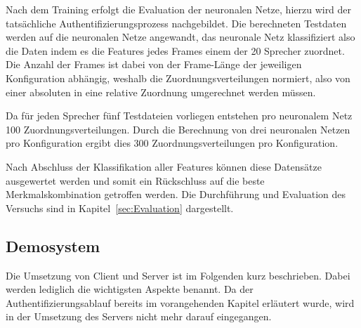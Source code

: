 Nach dem Training erfolgt die Evaluation der neuronalen Netze, hierzu wird der tatsächliche Authentifizierungsprozess nachgebildet.
Die berechneten Testdaten werden auf die neuronalen Netze angewandt, das neuronale Netz klassifiziert also die Daten indem es die Features jedes Frames einem der 20 Sprecher zuordnet.
Die Anzahl der Frames ist dabei von der Frame-Länge der jeweiligen Konfiguration abhängig, weshalb die Zuordnungsverteilungen normiert, also von einer absoluten in eine relative Zuordnung umgerechnet werden müssen.

Da für jeden Sprecher fünf Testdateien vorliegen entstehen pro neuronalem Netz 100 Zuordnungsverteilungen.
Durch die Berechnung von drei neuronalen Netzen pro Konfiguration ergibt dies 300 Zuordnungsverteilungen pro Konfiguration.

Nach Abschluss der Klassifikation aller Features können diese Datensätze ausgewertet werden und somit ein Rückschluss auf die beste Merkmalskombination getroffen werden.
Die Durchführung und Evaluation des Versuchs sind in Kapitel~\ref{sec:Evaluation} dargestellt.

\subsection{Demosystem}
Die Umsetzung von Client und Server ist im Folgenden kurz beschrieben.
Dabei werden lediglich die wichtigsten Aspekte benannt.
Da der Authentifizierungsablauf bereits im vorangehenden Kapitel erläutert wurde, wird in der Umsetzung des Servers nicht mehr darauf eingegangen.

